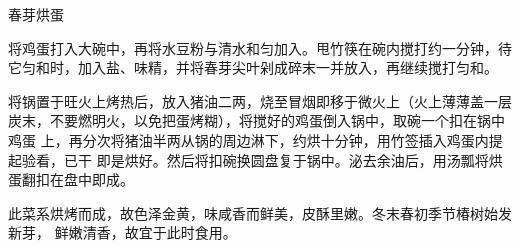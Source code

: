 \begin{recipe}{春芽烘蛋}

\ingredients


\preparation

\step 将鸡蛋打入大碗中，再将水豆粉与清水和匀加入。甩竹筷在碗内搅打约一分钟，待
它匀和时，加入盐、味精，并将春芽尖叶剁成碎末一并放入，再继续搅打匀和。

\step 将锅置于旺火上烤热后，放入猪油二两，烧至冒烟即移于微火上（火上薄薄盖一层
炭末，不要燃明火，以免把蛋烤糊），将搅好的鸡蛋倒入锅中，取碗一个扣在锅中鸡蛋
上，再分次将猪油半两从锅的周边淋下，约烘十分钟，用竹签插入鸡蛋内提起验看，已干
即是烘好。然后将扣碗换圆盘复于锅中。泌去余油后，用汤瓢将烘蛋翻扣在盘中即成。

\features

此菜系烘烤而成，故色泽金黄，味咸香而鲜美，皮酥里嫩。冬末春初季节椿树始发新芽，
鲜嫩清香，故宜于此时食用。

\end{recipe}

